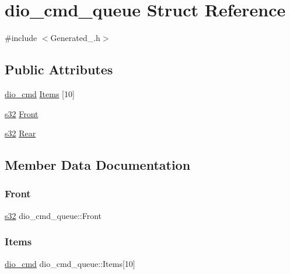 \hypertarget{structdio__cmd__queue}{}\section{dio\+\_\+cmd\+\_\+queue Struct Reference}
\label{structdio__cmd__queue}


{\ttfamily \#include $<$Generated\+\_.\+h$>$}

\subsection*{Public Attributes}
\begin{DoxyCompactItemize}
\item 
\hyperlink{dio__machine_8h_ac4b00fe9f70ff379f2ca79f1ac7828c4}{dio\+\_\+cmd} \hyperlink{structdio__cmd__queue_a29e9979e5bce86dab10b248bea3ca3c6}{Items} \mbox{[}10\mbox{]}
\item 
\hyperlink{ab__common_8h_ae9b1af5c037e57a98884758875d3a7c4}{s32} \hyperlink{structdio__cmd__queue_a15b4f61ae434e3d621f1d6ac227cd4d0}{Front}
\item 
\hyperlink{ab__common_8h_ae9b1af5c037e57a98884758875d3a7c4}{s32} \hyperlink{structdio__cmd__queue_a5669f4099d38a9344b6e6ab1982b1822}{Rear}
\end{DoxyCompactItemize}


\subsection{Member Data Documentation}
\mbox{\label{structdio__cmd__queue_a15b4f61ae434e3d621f1d6ac227cd4d0}} 
\subsubsection{\texorpdfstring{Front}{Front}}
{\footnotesize\ttfamily \hyperlink{ab__common_8h_ae9b1af5c037e57a98884758875d3a7c4}{s32} dio\+\_\+cmd\+\_\+queue\+::\+Front}

\mbox{\label{structdio__cmd__queue_a29e9979e5bce86dab10b248bea3ca3c6}} 
\subsubsection{\texorpdfstring{Items}{Items}}
{\footnotesize\ttfamily \hyperlink{dio__machine_8h_ac4b00fe9f70ff379f2ca79f1ac7828c4}{dio\+\_\+cmd} dio\+\_\+cmd\+\_\+queue\+::\+Items\mbox{[}10\mbox{]}}

